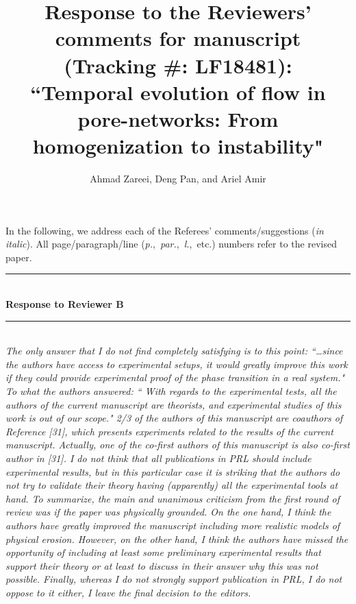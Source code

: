 \documentclass{article}
\title{
Response to the Reviewers' comments for manuscript \\
(Tracking \#: LF18481): \\
``Temporal evolution of flow in pore-networks: From homogenization to instability"
}
\author{Ahmad Zareei, Deng Pan, and  Ariel Amir
}
\date{}
\newcommand{\Hline}{\rule{\linewidth}{.1mm}}
\newcommand{\Question}[1]{\noindent \color{black}\emph{#1}\normalcolor}
\begin{document}
\maketitle

\noindent In the following, we address each of the Referees' comments/suggestions (\emph{in italic}). All page/paragraph/line (\textit{p.},\ \textit{par.},\ \textit{l.},\ etc.) numbers refer to the revised paper. %

\vspace{5 mm}
\noindent
\Hline \\
\textbf{Response to Reviewer B} \\
\Hline
\\



\Question{
The only answer that I do not find completely satisfying is to this
point: ``…since the authors have access to experimental setups, it
would greatly improve this work if they could provide experimental
proof of the phase transition in a real system." To what the authors
answered: `` With regards to the experimental tests, all the authors of
the current manuscript are theorists, and experimental studies of this
work is out of our scope." 2/3 of the authors of this manuscript are coauthors of Reference [31],
which presents experiments related to the results of the current
manuscript. Actually, one of the co-first authors of this manuscript
is also co-first author in [31]. I do not think that all publications
in PRL should include experimental results, but in this particular
case it is striking that the authors do not try to validate their
theory having (apparently) all the experimental tools at hand.
\newline
To summarize, the main and unanimous criticism from the first round of
review was if the paper was physically grounded. On the one hand, I
think the authors have greatly improved the manuscript including more
realistic models of physical erosion. However, on the other hand, I
think the authors have missed the opportunity of including at least
some preliminary experimental results that support their theory or at
least to discuss in their answer why this was not possible.
\newline
Finally, whereas I do not strongly support publication in PRL, I do
not oppose to it either, I leave the final decision to the editors.
\newline}
\end{document}
